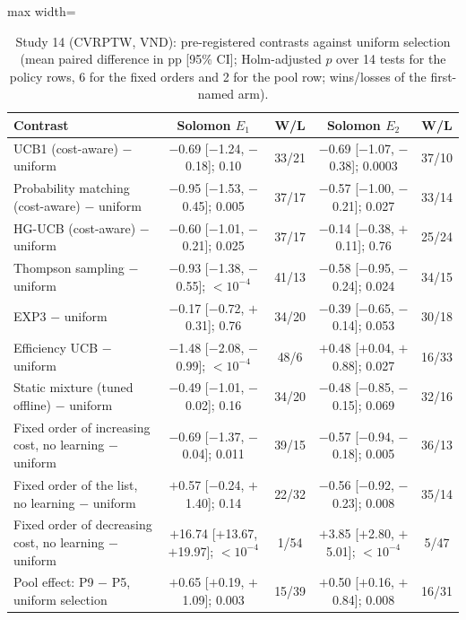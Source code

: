 \begin{table}[t]
\caption{Study 14 (CVRPTW, VND): pre-registered contrasts against uniform selection (mean paired difference in pp [95\% CI]; Holm-adjusted $p$ over 14 tests for the policy rows, 6 for the fixed orders and 2 for the pool row; wins/losses of the first-named arm).}\label{tab:s14tests}
\centering
\small
\begin{adjustbox}{max width=\linewidth}
\begin{tabular}{lcccc}
\toprule
Contrast & Solomon $E_1$ & W/L & Solomon $E_2$ & W/L \\
\midrule
UCB1 (cost-aware) $-$ uniform & $-$0.69 [$-$1.24, $-$0.18]; 0.10 & 33/21 & $-$0.69 [$-$1.07, $-$0.38]; 0.0003 & 37/10 \\
Probability matching (cost-aware) $-$ uniform & $-$0.95 [$-$1.53, $-$0.45]; 0.005 & 37/17 & $-$0.57 [$-$1.00, $-$0.21]; 0.027 & 33/14 \\
HG-UCB (cost-aware) $-$ uniform & $-$0.60 [$-$1.01, $-$0.21]; 0.025 & 37/17 & $-$0.14 [$-$0.38, $+$0.11]; 0.76 & 25/24 \\
Thompson sampling $-$ uniform & $-$0.93 [$-$1.38, $-$0.55]; \ensuremath{<10^{-4}} & 41/13 & $-$0.58 [$-$0.95, $-$0.24]; 0.024 & 34/15 \\
EXP3 $-$ uniform & $-$0.17 [$-$0.72, $+$0.31]; 0.76 & 34/20 & $-$0.39 [$-$0.65, $-$0.14]; 0.053 & 30/18 \\
Efficiency UCB $-$ uniform & $-$1.48 [$-$2.08, $-$0.99]; \ensuremath{<10^{-4}} & 48/6 & $+$0.48 [$+$0.04, $+$0.88]; 0.027 & 16/33 \\
Static mixture (tuned offline) $-$ uniform & $-$0.49 [$-$1.01, $-$0.02]; 0.16 & 34/20 & $-$0.48 [$-$0.85, $-$0.15]; 0.069 & 32/16 \\
Fixed order of increasing cost, no learning $-$ uniform & $-$0.69 [$-$1.37, $-$0.04]; 0.011 & 39/15 & $-$0.57 [$-$0.94, $-$0.18]; 0.005 & 36/13 \\
Fixed order of the list, no learning $-$ uniform & $+$0.57 [$-$0.24, $+$1.40]; 0.14 & 22/32 & $-$0.56 [$-$0.92, $-$0.23]; 0.008 & 35/14 \\
Fixed order of decreasing cost, no learning $-$ uniform & $+$16.74 [$+$13.67, $+$19.97]; \ensuremath{<10^{-4}} & 1/54 & $+$3.85 [$+$2.80, $+$5.01]; \ensuremath{<10^{-4}} & 5/47 \\
\addlinespace
Pool effect: P9 $-$ P5, uniform selection & $+$0.65 [$+$0.19, $+$1.09]; 0.003 & 15/39 & $+$0.50 [$+$0.16, $+$0.84]; 0.008 & 16/31 \\
\bottomrule
\end{tabular}
\end{adjustbox}
\end{table}
